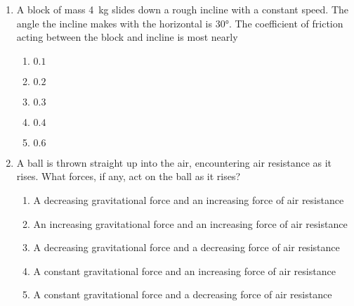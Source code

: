 \documentclass{../../oss-apphys}
\begin{document}
\begin{multicols}{2}
\begin{enumerate}[resume,leftmargin=18pt]
  \item A block of mass \SI{4}{\kilo\gram} slides down a rough incline with a
    constant speed. The angle the incline makes with the horizontal is
    \ang{30}. The coefficient of friction acting between the block and incline
    is most nearly
    \begin{center}
    \end{center}
    \begin{enumerate}[noitemsep,topsep=0pt,leftmargin=18pt,label=(\Alph*)]
    \item $0.1$
    \item $0.2$
    \item $0.3$
    \item $0.4$
    \item $0.6$
    \end{enumerate}


  \item A ball is thrown straight up into the air, encountering air resistance
    as it rises. What forces, if any, act on the ball as it rises?
    \begin{enumerate}[noitemsep,topsep=0pt,leftmargin=18pt,label=(\Alph*)]
    \item A decreasing gravitational force and an increasing force of air
      resistance
    \item An increasing gravitational force and an increasing force of air
      resistance
    \item A decreasing gravitational force and a decreasing force of air
      resistance
    \item A constant gravitational force and an increasing force of air
      resistance
    \item A constant gravitational force and a decreasing force of air
      resistance
    \end{enumerate}
  \end{enumerate}
  \columnbreak
  

\end{multicols}
\end{document}
